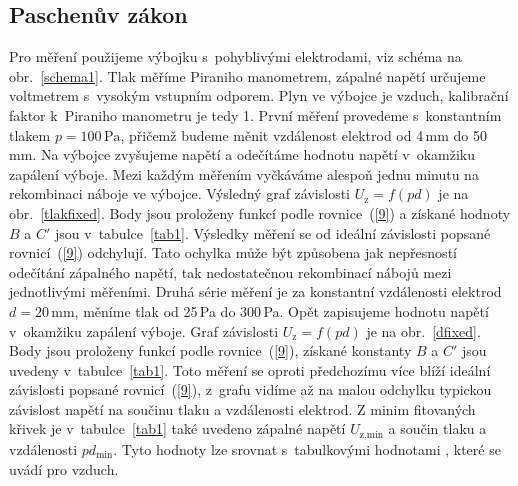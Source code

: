 \documentclass[a4paper,12pt]{article}
\begin{document}
\subsection{Paschenův zákon}
Pro měření použijeme výbojku s~pohyblivými elektrodami, viz schéma na 
obr.~\ref{schema1}. Tlak měříme Piraniho 
manometrem, zápalné napětí určujeme voltmetrem s~vysokým vstupním odporem. Plyn 
ve výbojce je vzduch, kalibrační faktor k~Piraniho manometru je tedy 1. První 
měření provedeme s~konstantním tlakem $p = 100\,\si{\pascal}$, přičemž budeme 
měnit vzdálenost elektrod od 4\,\si{\milli\meter} do 50\,\si{\milli\meter}. Na 
výbojce zvyšujeme napětí a odečítáme hodnotu napětí v~okamžiku zapálení výboje. 
Mezi každým měřením vyčkáváme alespoň jednu minutu na rekombinaci náboje ve 
výbojce. Výsledný graf závislosti $U_\text{z} = f(pd)$ je na 
obr.~\ref{tlakfixed}. 
Body jsou proloženy funkcí podle rovnice~(\ref{9}) a získané hodnoty $B$ 
a $C'$ jsou v~tabulce~\ref{tab1}. Výsledky měření se od ideální závislosti 
popsané 
rovnicí~(\ref{9}) odchylují. Tato ochylka může být způsobena jak 
nepřesností odečítání zápalného napětí, tak nedostatečnou rekombinací nábojů 
mezi jednotlivými měřeními. 
Druhá série měření je za konstantní vzdálenosti elektrod $d = 
20\,\si{\milli\meter}$, 
měníme tlak od 25\,\si{\pascal} do 300\,\si{\pascal}. Opět zapisujeme hodnotu 
napětí v~okamžiku zapálení výboje. Graf závislosti $U_\text{z} = f(pd)$ je na 
obr.~\ref{dfixed}. Body jsou proloženy funkcí podle rovnice~(\ref{9}), získané 
konstanty 
$B$ a $C'$ jsou uvedeny v~tabulce~\ref{tab1}. Toto měření se oproti 
předchozímu více 
blíží ideální závislosti popsané rovnicí~(\ref{9}), z~grafu vidíme až na malou 
odchylku typickou závislost napětí na součinu tlaku a vzdálenosti elektrod.
Z minim fitovaných křivek je v~tabulce~\ref{tab1} také uvedeno zápalné napětí 
$U_\text{z,min}$ a 
součin tlaku a vzdálenosti $pd_{\text{min}}$. Tyto hodnoty 
lze srovnat s~tabulkovými hodnotami \cite{wiki}, které se uvádí pro vzduch.

%
\end{document}
